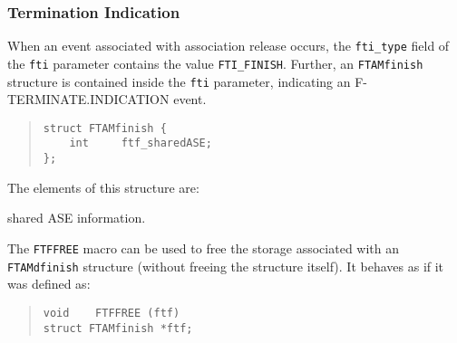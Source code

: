 \subsubsection	{Termination Indication}
When an event associated with association release occurs,
the \verb"fti_type" field of the \verb"fti" parameter contains the value
\verb"FTI_FINISH".
Further,
an \verb"FTAMfinish" structure is contained inside the \verb"fti" parameter,
indicating an {\sf F-TERMINATE.INDICATION\/} event.
\begin{quote}\small\begin{verbatim}
struct FTAMfinish {
    int     ftf_sharedASE;
};
\end{verbatim}\end{quote}
The elements of this structure are:
\begin{describe}
\item[\verb"ftf\_sharedASE":] shared ASE information.
\end{describe}
The \verb"FTFFREE" macro can be used to free the storage associated with an
\verb"FTAMdfinish" structure (without freeing the structure itself).
It behaves as if it was defined as:
\begin{quote}\small\begin{verbatim}
void    FTFFREE (ftf)
struct FTAMfinish *ftf;
\end{verbatim}\end{quote}

